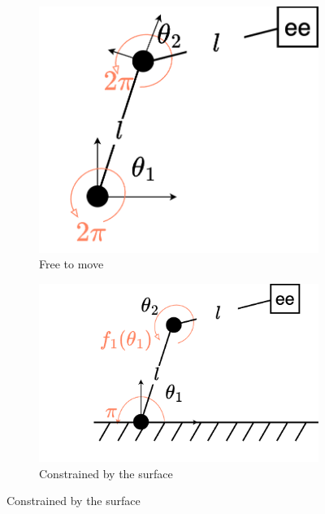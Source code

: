 \begin{figure}
    \centering
    \begin{subfigure}[t]{0.32\linewidth}
        \centering
        \includegraphics[width=\linewidth,height=\panelheight,keepaspectratio]{figures/ch2/ch2-planar-manipulator-free.png}
        \caption{Free to move}
        \label{fig:planar-manipulation-simple}
    \end{subfigure}\hfill
    \begin{subfigure}[t]{0.32\linewidth}
        \centering
        \includegraphics[width=\linewidth,height=\panelheight,keepaspectratio]{figures/ch2/ch2-planar-manipulator-floor.png}
        \caption{Constrained by the surface}
        \label{fig:planar-manipulator-floor}

\end{subfigure}
\end{figure}

